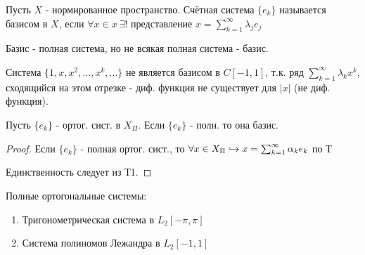 \documentclass{article}
\begin{document}
\begin{definition}
  Пусть $X$ - нормированное пространство. Счётная система $\{e_k\}$ называется базисом в $X$,
  если $\forall x \in x \ \exists !$ представление $x=\sum_{k=1}^{\infty}\lambda_je_j$
\end{definition}
\begin{remark}
  Базис - полная система, но не всякая полная система - базис.
\end{remark}
\begin{eg}
  Система $\{1,x,x^{2},\dots ,x^{k},\dots \}$ не является базисом в $C[-1,1]$,
  т.к. ряд $\sum_{k=1}^{\infty}\lambda_kx^{k}$, сходящийся на этом отрезке
  - диф. функция не существует для $|x|$ (не диф. функция).
\end{eg}
\begin{theorem}[Т9]
  Пусть $\{e_k\}$ - ортог. сист. в $X_\Pi$. Если $\{e_k\}$ - полн. то она базис.
\end{theorem}
\begin{proof}
  Если $\{e_k\}$ - полная ортог. сист., то $\forall x \in X_\Pi \hookrightarrow x = \sum_{k=1}^{\infty}\alpha_ke_k$ по Т%

  Единственность следует из Т1.
\end{proof}
\begin{eg}
  Полные ортогональные системы:
  \begin{enumerate}
    \item Тригонометрическая система в $L_2[-\pi,\pi]$
    \item Система полиномов Лежандра в $L_2[-1,1]$
  \end{enumerate}
\end{eg}
\end{document}
